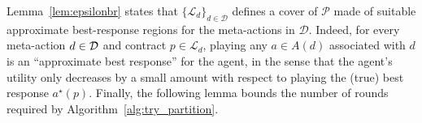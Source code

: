 %
%
Lemma~\ref{lem:epsilonbr} states that $\{\mathcal{L}_{d}\}_{d\in  \mathcal{D} }$ defines a cover of $\mathcal{P}$ made of suitable approximate best-response regions for the meta-actions in $\mathcal{D}$.
%
Indeed, for every meta-action $d \in \mathcal{D}$ and contract $p \in \mathcal{L}_d$, playing any $a \in A(d)$ associated with $d$ is an ``approximate best response'' for the agent, in the sense that the agent's utility only decreases by a small amount with respect to playing the (true) best response $a^\star(p)$.
%
%
%
%
%
Finally, the following lemma bounds the number of rounds required by Algorithm~\ref{alg:try_partition}.
%
